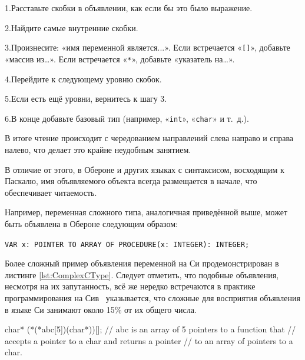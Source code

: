 \documentclass[utf8]{lgu}
\newcommand{\tire}{\unskip\nobreak\thinspace\textemdash\thinspace}
\newcommand{\code}[1]{{\normalsize\texttt{#1}}}
\begin{document}
1.\hspace{0.5em}Расставьте скобки в объявлении, как если бы это было выражение.

2.\hspace{0.5em}Найдите самые внутренние скобки.

3.\hspace{0.5em}Произнесите: «имя переменной является...». Если встречается «\code{[]}», добавьте «массив из\ldots». Если встречается «\code{*}», добавьте «указатель на\ldots».

4.\hspace{0.5em}Перейдите к следующему уровню скобок.

5.\hspace{0.5em}Если есть ещё уровни, вернитесь к шагу 3.

6.\hspace{0.5em}В конце добавьте базовый тип (например, «\code{int}», «\code{char}» и т.~д.).

В итоге чтение происходит с чередованием направлений слева направо и справа налево, что делает это крайне неудобным занятием.

В отличие от этого, в Обероне и других языках с синтаксисом, восходящим к Паскалю, имя объявляемого объекта всегда размещается в начале, что обеспечивает читаемость.

Например, переменная сложного типа, аналогичная приведённой выше, может быть объявлена в Обероне следующим образом:

\begin{center}
\code{VAR x: POINTER TO ARRAY OF PROCEDURE(x: INTEGER): INTEGER;}
\end{center}

Более сложный пример объявления переменной на Си продемонстрирован в листинге \ref{lst:ComplexCType}. Следует отметить, что подобные объявления, несмотря на их запутанность, всё же нередко встречаются в практике программирования на Си\tire в~\cite{ComplexDeclarations1, ComplexDeclarations2} указывается, что сложные для восприятия объявления в языке Си занимают около 15\% от их общего числа.

\begin{listing}[H]
\caption{Сложное объявление переменной на~языке~Си}
\vspace{-17pt}
\label{lst:ComplexCType}
\begin{cc}
char* (*(*abc[5])(char*))[];
// abc is an array of 5 pointers to a function that
// accepts a pointer to a char and returns a pointer
// to an array of pointers to a char.
\end{cc}
\end{listing}
\end{document}
